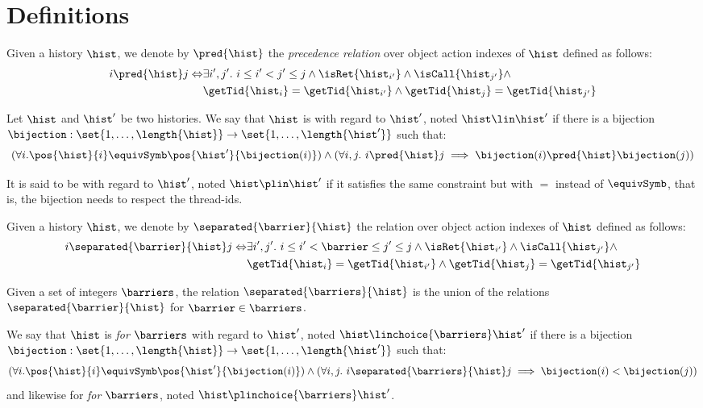 \section{Definitions} 


Given a history $\hist$, we denote by $\pred{\hist}$ the \emph{precedence
relation} over object action indexes of $\hist$ defined as follows:
\begin{align*}
i \pred{\hist} j \Leftrightarrow 
&\exists i',j'.\ i \leq i' < j' \leq j \land
\isRet{\hist_{i'}} \land \isCall{\hist_{j'}} \land \\
& \getTid{\hist_i} = \getTid{\hist_{i'}} \land 
\getTid{\hist_j} = \getTid{\hist_{j'}}
\end{align*}

Let $\hist$ and $\hist'$ be two histories. We say that $\hist$ is 
\emph{\linearizable} with regard to $\hist'$, noted $\hist \lin \hist'$
if there is a bijection 
$\bijection: \set{1,\dots,\length{\hist}} \rightarrow
\set{1,\dots,\length{\hist'}}$ such that:
\[
(\forall i. \pos{\hist}{i} \equivSymb \pos{\hist'}{\bijection(i)}) \land
(\forall i,j.\ i \pred{\hist} j \implies
              \bijection(i) \pred{\hist} \bijection(j)) 
\]

It is said to be \emph{\precisely} with regard to $\hist'$, noted 
$\hist \plin \hist'$ if it satisfies the
same constraint but with $=$ instead of $\equivSymb$, that is, the 
bijection needs to respect the thread-ids.

Given a history $\hist$, we denote by $\separated{\barrier}{\hist}$ the 
relation over object action indexes of $\hist$ defined as follows:
\begin{align*}
i \separated{\barrier}{\hist} j \Leftrightarrow 
&\exists i',j'.\ i \leq i' < \barrier \leq j' \leq j \land
\isRet{\hist_{i'}} \land \isCall{\hist_{j'}} \land \\
& \getTid{\hist_i} = \getTid{\hist_{i'}} \land 
\getTid{\hist_j} = \getTid{\hist_{j'}}
\end{align*}

Given a set of integers $\barriers$, the relation 
$\separated{\barriers}{\hist}$ is the union of the relations 
$\separated{\barrier}{\hist}$ for $\barrier \in \barriers$.

We say that $\hist$ is \emph{\linearizable{} for $\barriers$} with regard to 
$\hist'$, noted $\hist \linchoice{\barriers} \hist'$
if there is a bijection $\bijection: \set{1,\dots,\length{\hist}} \rightarrow
\set{1,\dots,\length{\hist'}}$ such that:
\[
(\forall i. \pos{\hist}{i} \equivSymb \pos{\hist'}{\bijection(i)}) \land
(\forall i,j.\ i \separated{\barriers}{\hist} j \implies
              \bijection(i) < \bijection(j))
\]
and likewise for \emph{\precisely{} for $\barriers$}, noted 
$\hist \plinchoice{\barriers} \hist'$.

